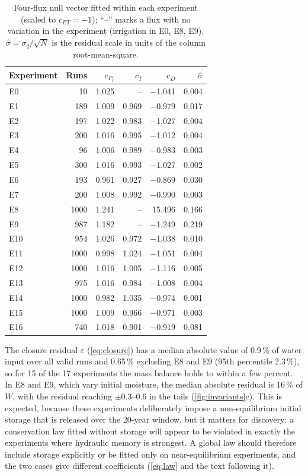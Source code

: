 \begin{table}[H]\centering\small
\caption{Four-flux null vector fitted within each experiment (scaled to $c_{\mathit{ET}}=-1$); ``--'' marks a flux with no variation in the experiment (irrigation in E0, E8, E9). $\hat\sigma=\sigma_q/\sqrt N$ is the residual scale in units of the column root-mean-square.}
\label{tab:svdexp}
\begin{tabular}{lrrrrr}
\toprule
Experiment & Runs & $c_{P_r}$ & $c_{I}$ & $c_{D}$ & $\hat\sigma$\\\midrule
E0 & 10 & 1.025 & -- & $-$1.041 & 0.004\\
E1 & 189 & 1.009 & 0.969 & $-$0.979 & 0.017\\
E2 & 197 & 1.022 & 0.983 & $-$1.027 & 0.004\\
E3 & 200 & 1.016 & 0.995 & $-$1.012 & 0.004\\
E4 & 96 & 1.006 & 0.989 & $-$0.983 & 0.003\\
E5 & 300 & 1.016 & 0.993 & $-$1.027 & 0.002\\
E6 & 193 & 0.961 & 0.927 & $-$0.869 & 0.030\\
E7 & 200 & 1.008 & 0.992 & $-$0.990 & 0.003\\
E8 & 1000 & 1.241 & -- & 15.496 & 0.166\\
E9 & 987 & 1.182 & -- & $-$1.249 & 0.219\\
E10 & 954 & 1.026 & 0.972 & $-$1.038 & 0.010\\
E11 & 1000 & 0.998 & 1.024 & $-$1.051 & 0.004\\
E12 & 1000 & 1.016 & 1.005 & $-$1.116 & 0.005\\
E13 & 975 & 1.016 & 0.984 & $-$1.008 & 0.004\\
E14 & 1000 & 0.982 & 1.035 & $-$0.974 & 0.001\\
E15 & 1000 & 1.009 & 0.966 & $-$0.971 & 0.003\\
E16 & 740 & 1.018 & 0.901 & $-$0.919 & 0.081\\
\bottomrule
\end{tabular}
\end{table}

The closure residual $\varepsilon$ (\cref{eq:closure}) has a median absolute value of 0.9\,\% of water input over all valid runs and 0.65\,\% excluding E8 and E9 (95th percentile 2.3\,\%), so for 15 of the 17 experiments the mass balance holds to within a few percent. In E8 and E9, which vary initial moisture, the median absolute residual is 16\,\% of $W$, with the residual reaching $\pm0.3$--0.6 in the tails (\cref{fig:invariants}c). This is expected, because these experiments deliberately impose a non-equilibrium initial storage that is released over the 20-year window, but it matters for discovery: a conservation law fitted without storage will appear to be violated in exactly the experiments where hydraulic memory is strongest. A global law should therefore include storage explicitly or be fitted only on near-equilibrium experiments, and the two cases give different coefficients (\cref{eq:law} and the text following it).

